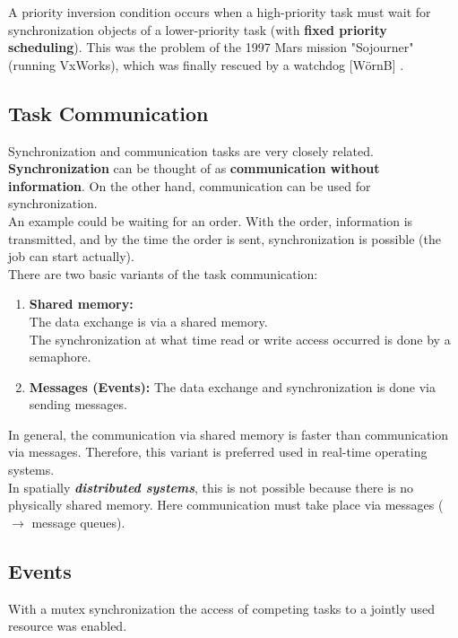 A priority inversion condition occurs when a high-priority task must wait for synchronization objects of a lower-priority task (with \textbf{fixed priority scheduling}). This was the problem of the 1997 Mars mission "Sojourner" (running VxWorks), which was finally rescued by a watchdog [W\"{o}rnB] .


\subsection{Task Communication}

Synchronization and communication tasks are very closely related. \textbf{Synchronization} can be thought of as\textbf{ communication without information}. On the other hand, communication can be used for synchronization.\\

An example could be waiting for an order. With the order, information is transmitted, and by the time the order is sent, synchronization is possible (the job can start actually).\\

There are two basic variants of the task communication:

\begin{enumerate}
	\item  \textbf{Shared memory: } \\
	The data exchange is via a shared memory.\\
	The synchronization at what time read or write access occurred is done by a semaphore.
	\item  \textbf{Messages (Events): }The data exchange and synchronization is done via sending messages.
\end{enumerate}

In general, the communication via shared memory is faster than communication via messages. Therefore, this variant is preferred used in real-time operating systems. \\

In spatially \textbf{\textit{distributed systems}}, this is not possible because there is no physically shared memory. Here communication must take place via messages ($\rightarrow$ message queues).
\newpage
\subsection{Events}

With a mutex synchronization the access of competing tasks to a jointly used resource was enabled. \\

